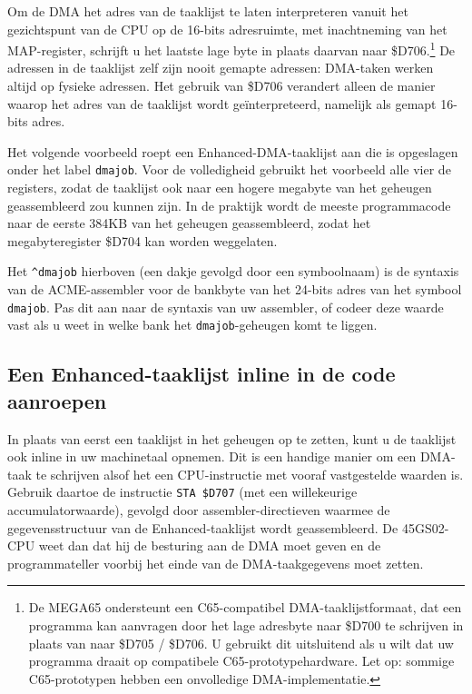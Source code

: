 Om de DMA het adres van de taaklijst te laten interpreteren vanuit het gezichtspunt van de CPU op de 16-bits adresruimte, met inachtneming van het MAP-register, schrijft u het laatste lage byte in plaats daarvan naar \$D706.\footnote{De MEGA65 ondersteunt een C65-compatibel DMA-taaklijstformaat, dat een programma kan aanvragen door het lage adresbyte naar \$D700 te schrijven in plaats van naar \$D705 / \$D706. U gebruikt dit uitsluitend als u wilt dat uw programma draait op compatibele C65-prototypehardware. Let op: sommige C65-prototypen hebben een onvolledige DMA-implementatie.} De adressen in de taaklijst zelf zijn nooit gemapte adressen: DMA-taken werken altijd op fysieke adressen. Het gebruik van \$D706 verandert alleen de manier waarop het adres van de taaklijst wordt geïnterpreteerd, namelijk als gemapt 16-bits adres.

Het volgende voorbeeld roept een Enhanced-DMA-taaklijst aan die is opgeslagen onder het label {\tt dmajob}. Voor de volledigheid gebruikt het voorbeeld alle vier de registers, zodat de taaklijst ook naar een hogere megabyte van het geheugen geassembleerd zou kunnen zijn. In de praktijk wordt de meeste programmacode naar de eerste 384KB van het geheugen geassembleerd, zodat het megabyteregister \$D704 kan worden weggelaten.


Het {\tt \^{}dmajob} hierboven (een dakje gevolgd door een symboolnaam) is de syntaxis van de ACME-assembler voor de bankbyte van het 24-bits adres van het symbool {\tt dmajob}. Pas dit aan naar de syntaxis van uw assembler, of codeer deze waarde vast als u weet in welke bank het {\tt dmajob}-geheugen komt te liggen.

\subsection{Een Enhanced-taaklijst inline in de code aanroepen}

In plaats van eerst een taaklijst in het geheugen op te zetten, kunt u de taaklijst ook inline in uw machinetaal opnemen. Dit is een handige manier om een DMA-taak te schrijven alsof het een CPU-instructie met vooraf vastgestelde waarden is. Gebruik daartoe de instructie \texttt{STA \$D707} (met een willekeurige accumulatorwaarde), gevolgd door assembler-directieven waarmee de gegevensstructuur van de Enhanced-taaklijst wordt geassembleerd. De 45GS02-CPU weet dan dat hij de besturing aan de DMA moet geven en de programmateller voorbij het einde van de DMA-taakgegevens moet zetten.

